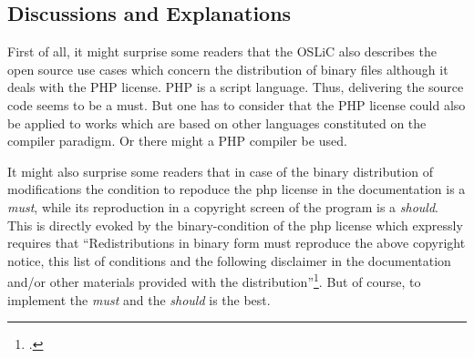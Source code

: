\subsection{Discussions and Explanations}

\label{sec:PhpDiscussions}

First of all, it might surprise some readers that the OSLiC also describes the
open source use cases which concern the distribution of binary files although it
deals with the PHP license. PHP is a script language. Thus, delivering the
source code seems to be a must. But one has to consider that the PHP license
could also be applied to works which are based on other languages constituted on
the compiler paradigm. Or there might a PHP compiler be used.

It might also surprise some readers that in case of the binary distribution of
modifications the condition to repoduce the php license in the documentation is
a \emph{must}, while its reproduction in a copyright screen of the program is a
\emph{should}. This is directly evoked by the binary-condition of the php license
which expressly requires that \enquote{Redistributions in binary form must
reproduce the above copyright notice, this list of conditions and the following
disclaimer in the documentation and/or other materials provided with the
distribution}\footcite[cf.][wp. §2]{Php30OsiLicense2013a}. But of course, to
implement the \emph{must} and the \emph{should} is the best.

%
